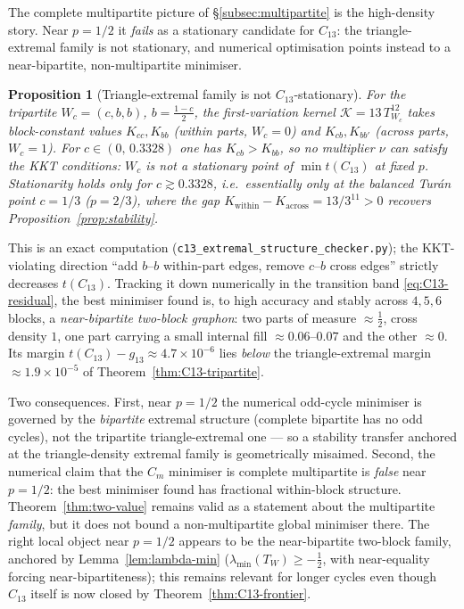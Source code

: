 \documentclass[11pt]{article}
\newtheorem{proposition}[theorem]{Proposition}
\begin{document}
The complete multipartite picture of \S\ref{subsec:multipartite} is the high-density story.  Near $p=1/2$ it \emph{fails} as a stationary candidate for $C_{13}$: the triangle-extremal family is not stationary, and numerical optimisation points instead to a near-bipartite, non-multipartite minimiser.

\begin{proposition}[Triangle-extremal family is not $C_{13}$-stationary]\label{prop:tri-not-stationary}
For the tripartite $W_c=(c,b,b)$, $b=\tfrac{1-c}2$, the first-variation kernel $\mathcal K=13\,T_{W_c}^{12}$ takes block-constant values $K_{cc},K_{bb}$ (within parts, $W_c=0$) and $K_{cb},K_{bb'}$ (across parts, $W_c=1$).  For $c\in(0,\,0.3328)$ one has $K_{cb}>K_{bb}$, so no multiplier $\nu$ can satisfy the KKT conditions: $W_c$ is not a stationary point of $\min t(C_{13})$ at fixed $p$.  Stationarity holds only for $c\gtrsim0.3328$, i.e.\ essentially only at the balanced Tur\'an point $c=1/3$ ($p=2/3$), where the gap $K_{\mathrm{within}}-K_{\mathrm{across}}=13/3^{11}>0$ recovers Proposition~\ref{prop:stability}.
\end{proposition}

This is an exact computation (\texttt{c13\_extremal\_structure\_checker.py}); the KKT-violating direction ``add $b$--$b$ within-part edges, remove $c$--$b$ cross edges'' strictly decreases $t(C_{13})$.  Tracking it down numerically in the transition band \eqref{eq:C13-residual}, the best minimiser found is, to high accuracy and stably across $4,5,6$ blocks, a \emph{near-bipartite two-block graphon}: two parts of measure $\approx\tfrac12$, cross density $1$, one part carrying a small internal fill $\approx0.06$--$0.07$ and the other $\approx0$.  Its margin $t(C_{13})-g_{13}\approx4.7\times10^{-6}$ lies \emph{below} the triangle-extremal margin $\approx1.9\times10^{-5}$ of Theorem~\ref{thm:C13-tripartite}.

Two consequences.  First, near $p=1/2$ the numerical odd-cycle minimiser is governed by the \emph{bipartite} extremal structure (complete bipartite has no odd cycles), not the tripartite triangle-extremal one --- so a stability transfer anchored at the triangle-density extremal family is geometrically misaimed.  Second, the numerical claim that the $C_m$ minimiser is complete multipartite is \emph{false} near $p=1/2$: the best minimiser found has fractional within-block structure.  Theorem~\ref{thm:two-value} remains valid as a statement about the multipartite \emph{family}, but it does not bound a non-multipartite global minimiser there.  The right local object near $p=1/2$ appears to be the near-bipartite two-block family, anchored by Lemma~\ref{lem:lambda-min} ($\lambda_{\min}(T_W)\ge-\tfrac12$, with near-equality forcing near-bipartiteness); this remains relevant for longer cycles even though $C_{13}$ itself is now closed by Theorem~\ref{thm:C13-frontier}.
\end{document}
